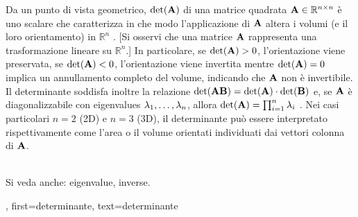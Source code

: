 {{Da un punto di vista geometrico, $\det({\bf A})$ di una matrice quadrata 
 	${\bf A} \in \mathbb{R}^{n \times n}$ è uno scalare che caratterizza in che modo 
	l’applicazione di ${\bf A}$ altera i volumi (e il loro orientamento) in $\mathbb{R}^n$ \cite{GolubVanLoanBook,Strang2007}. 
 	[Si osservi che una matrice ${\bf A}$ rappresenta una trasformazione lineare su $\mathbb{R}^{n}$.] 
 	In particolare, se $\det({\bf A}) > 0$, l'orientazione viene preservata, se $\det({\bf A}) < 0$, l'orientazione viene invertita 
	mentre $\det({\bf A}) = 0$ implica un annullamento completo del volume, indicando che ${\bf A}$ non è invertibile. 
 	Il determinante soddisfa inoltre la relazione $\det({\bf A} {\bf B}) = \det({\bf A}) \cdot \det({\bf B})$ e, se ${\bf A}$ è 
 	diagonalizzabile con \glspl{eigenvalue} $\lambda_{1}, \ldots, \lambda_{n}$, allora $\det({\bf A}) = \prod_{i=1}^{n} \lambda_{i}$ \cite{HornMatAnalysis}.
    Nei casi particolari $n=2$ (2D) e $n=3$ (3D), il determinante può essere interpretato rispettivamente come l’area o il volume orientati individuati dai vettori colonna di ${\bf A}$.
    \begin{figure} 
    	\begin{center}
	\end{center}
	\end{figure}
		\\ 
		Si veda anche: \gls{eigenvalue}, \gls{inverse}.
	},
	first={determinante},
	text={determinante}
}

